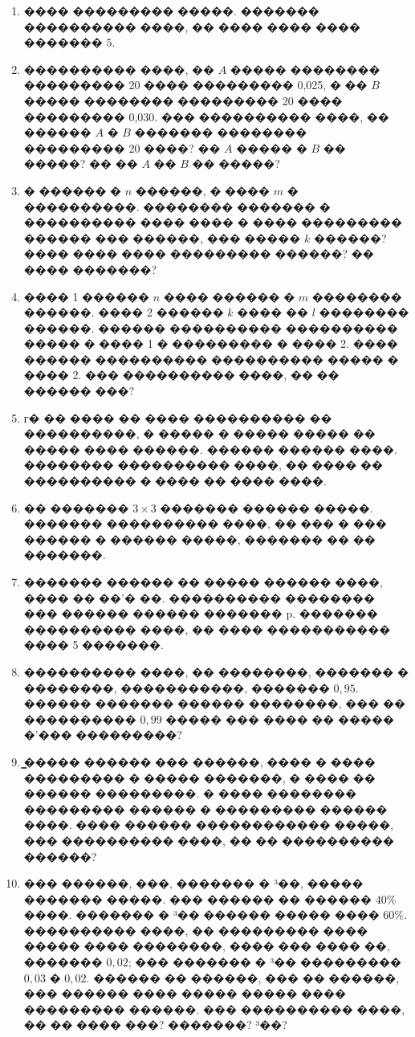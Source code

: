 \documentclass[a4paper,12pt]{article}
\begin{document}
\begin{enumerate}
\item ���� ��������� �����. ������� ���������� ����, �� ���� ���� ���� ������� $5$.

\item ���������� ����, �� $A$
����� �������� ��������� 20 ���� ��������� 0,025, � �� $B$ ����� ��������
��������� 20 ���� ��������� 0,030. ��� ���������� ����, �� ������ $A$
� $B$ ������� �������� ��������� 20 ����? �� $A$ ����� � $B$ �� �����? �� �� $A$ �� $B$ �� �����?

\item
� ������ � $n$ ������, � ���� $m$ � ����������. �������� ������� � ���������� ���� ���� � ���� ��������� ������ ��� ������, ��� ����� $k$ ������? ���� ���� ���� ��������� ������? �� ���� �������?

\item ���� 1 ������ $n$
���� ������ � $m$
�������� ������. ���� 2 ������ $k$ ���� �� $l$ �������� ������. ������ ���������� ���������� ����� � ���� 1 � ��������� � ���� 2. ���� ������ ���������� ���������� ����� �
���� 2. ��� ���������� ����, �� �� ������ ���?

\item г� �� ���� �� ���� ���������� �� ����������, � ����� � ����� ����� �� ����� ���� ������. ������ ������ ����. �������� ���������� ����, �� ���� �� ���������� � ���� �� ���� ����.

\item �� ������� $3\times 3$ ������� ������ �����. ������� ���������� ����, �� ��� � ��� ������ � ������ �����, ������� �� �� �������.

\item ������� ������ �� ����� ������ ����, ���� �� ��'� ��. ���������� �������� ��� ������ ������ ������� p. ������� ���������� ����, �� ���� ����������� ���� 5 �������.

\item ���������� ����, �� ��������, ������� � ��������, �����������, ������� $0,95$.
������ ������� ������ ��������, ��� �� ���������� $0,99$ ����� ��� ���� �� ����� �'��� ���������?

\item ̳����� ������ ��� ������, ���� � ���� ��������� � ����� �������, � ���� �� ������
���������. � ���� �������� ��������� ������ � ��������� ������ ����. ���� ������ ������������ �����, ��� ���������� ����, �� �� ���������� ������?

\item ��� ������, ���, ������� � ³��, ����� ������� �����. ��� ������ �� ������ $40\%$ ����. ������� � ³�� ������ ����� ���� $60\%$. ���������� ����, �� ��������� ���� ����� ���� ��������, ���� ��� ���� ��, ������� $0,02$; ��� �������
� ³�� ��������� $0,03$ � $0,02$. ������ �� ������, ��� ��
������, ��� ������ ���� ����� ����� ���� ��������� ������. ��� ���������� ����, �� �� ���� ���? �������? ³��?


\end{enumerate}
\end{document}
